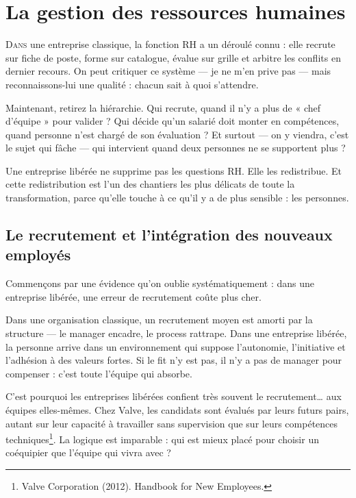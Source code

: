 
\chapter{La gestion des ressources humaines}

\lettrine[lines=2]{D}{ans} une entreprise classique, la fonction RH a un déroulé connu : elle recrute sur fiche de poste, forme sur catalogue, évalue sur grille et arbitre les conflits en dernier recours. On peut critiquer ce système — je ne m'en prive pas — mais reconnaissons-lui une qualité : chacun sait à quoi s'attendre.

Maintenant, retirez la hiérarchie. Qui recrute, quand il n'y a plus de « chef d'équipe » pour valider ? Qui décide qu'un salarié doit monter en compétences, quand personne n'est chargé de son évaluation ? Et surtout — on y viendra, c'est le sujet qui fâche — qui intervient quand deux personnes ne se supportent plus ?

Une entreprise libérée ne supprime pas les questions RH. Elle les redistribue. Et cette redistribution est l'un des chantiers les plus délicats de toute la transformation, parce qu'elle touche à ce qu'il y a de plus sensible : les personnes.

\section{Le recrutement et l'intégration des nouveaux employés}

Commençons par une évidence qu'on oublie systématiquement : dans une entreprise libérée, une erreur de recrutement coûte plus cher.

Dans une organisation classique, un recrutement moyen est amorti par la structure — le manager encadre, le process rattrape. Dans une entreprise libérée, la personne arrive dans un environnement qui suppose l'autonomie, l'initiative et l'adhésion à des valeurs fortes. Si le fit n'y est pas, il n'y a pas de manager pour compenser : c'est toute l'équipe qui absorbe.

C'est pourquoi les entreprises libérées confient très souvent le recrutement… aux équipes elles-mêmes. Chez Valve, les candidats sont évalués par leurs futurs pairs, autant sur leur capacité à travailler sans supervision que sur leurs compétences techniques\footnote{Valve Corporation (2012). Handbook for New Employees.}. La logique est imparable : qui est mieux placé pour choisir un coéquipier que l'équipe qui vivra avec ?

